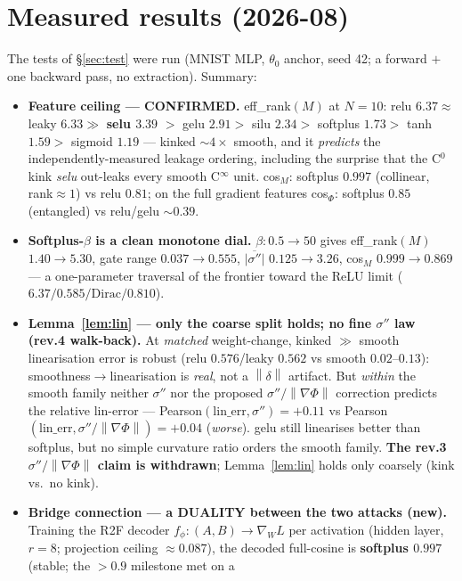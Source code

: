 \documentclass[11pt]{article}
\newcommand{\norm}[1]{\left\lVert #1 \right\rVert}
\begin{document}
\section{Measured results (2026-08)}\label{sec:measured}
The tests of \S\ref{sec:test} were run (MNIST MLP, $\theta_0$ anchor, seed 42; a forward $+$ one
backward pass, no extraction). Summary:
\begin{itemize}
  \item \textbf{Feature ceiling --- CONFIRMED.} eff\_rank$(M)$ at $N{=}10$:
  relu $6.37\approx$ leaky $6.33 \gg$ \textbf{selu $3.39$} $>$ gelu $2.91 >$ silu $2.34 >$ softplus
  $1.73 >$ tanh $1.59 >$ sigmoid $1.19$ --- kinked $\sim\!4\times$ smooth, and it \emph{predicts} the
  independently-measured leakage ordering, including the surprise that the C$^0$ kink \emph{selu}
  out-leaks every smooth C$^\infty$ unit. cos$_M$: softplus $0.997$ (collinear, rank$\approx1$) vs relu
  $0.81$; on the full gradient features cos$_\Phi$: softplus $0.85$ (entangled) vs relu/gelu $\sim0.39$.
  \item \textbf{Softplus-$\beta$ is a clean monotone dial.} $\beta\!:0.5\to50$ gives eff\_rank$(M)$
  $1.40\to5.30$, gate range $0.037\to0.555$, $\overline{|\sigma''|}$ $0.125\to3.26$, cos$_M$
  $0.999\to0.869$ --- a one-parameter traversal of the frontier toward the ReLU limit
  ($6.37/0.585/\text{Dirac}/0.810$).
  \item \textbf{Lemma~\ref{lem:lin} --- only the coarse split holds; no fine $\sigma''$ law (rev.4
  walk-back).} At \emph{matched} weight-change, kinked $\gg$ smooth linearisation error is robust
  (relu $0.576$/leaky $0.562$ vs smooth $0.02$--$0.13$): smoothness$\to$linearisation is \emph{real},
  not a $\norm{\delta}$ artifact. But \emph{within} the smooth family neither $\sigma''$ nor the
  proposed $\sigma''/\norm{\nabla\Phi}$ correction predicts the relative lin-error ---
  Pearson$(\text{lin\_err},\sigma'')=+0.11$ vs Pearson$(\text{lin\_err},\sigma''/\norm{\nabla\Phi})=+0.04$
  (\emph{worse}). gelu still linearises better than softplus, but no simple curvature ratio orders the
  smooth family. \textbf{The rev.3 $\sigma''/\norm{\nabla\Phi}$ claim is withdrawn}; Lemma~\ref{lem:lin}
  holds only coarsely (kink vs.\ no kink).
  \item \textbf{Bridge connection --- a DUALITY between the two attacks (new).} Training the R2F decoder
  $f_\phi:(A,B)\to\nabla_W L$ per activation (hidden layer, $r{=}8$; projection ceiling $\approx0.087$),
  the decoded full-cosine is \textbf{softplus $0.997$} (stable; the $>\!0.9$ milestone met on a

\end{itemize}
\end{document}
